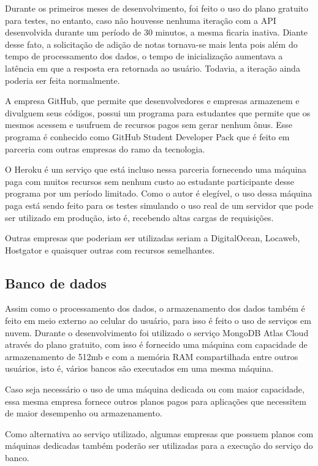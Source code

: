 Durante os primeiros meses de desenvolvimento, foi feito o uso do plano gratuito para testes, no entanto, caso não houvesse nenhuma iteração com a API desenvolvida durante um período de 30 minutos, a mesma ficaria inativa. Diante desse fato, a solicitação de adição de notas tornava-se mais lenta pois além do tempo de processamento dos dados, o tempo de inicialização aumentava a latência em que a resposta era retornada ao usuário. Todavia, a iteração ainda poderia ser feita normalmente.

A empresa GitHub, que permite que desenvolvedores e empresas armazenem e divulguem seus códigos, possui um programa para estudantes que permite que os mesmos acessem e usufruem de recursos pagos sem gerar nenhum ônus. Esse programa é conhecido como GitHub Student Developer Pack\cite{githubStudentPack} que é feito em parceria com outras empresas do ramo da tecnologia.

O Heroku é um serviço que está incluso nessa parceria fornecendo uma máquina paga com muitos recursos sem nenhum custo ao estudante participante desse programa por um período limitado. Como o autor é elegível, o uso dessa máquina paga está sendo feito para os testes simulando o uso real de um servidor que pode ser utilizado em produção, isto é, recebendo altas cargas de requisições.

Outras empresas que poderiam ser utilizadas seriam a DigitalOcean, Locaweb, Hostgator e quaisquer outras com recursos semelhantes.

\subsection{Banco de dados}

Assim como o processamento dos dados, o armazenamento dos dados também é feito em meio externo ao celular do usuário, para isso é feito o uso de serviços em nuvem. Durante o desenvolvimento foi utilizado o serviço MongoDB Atlas Cloud através do plano gratuito, com isso é fornecido uma máquina com capacidade de armazenamento de 512mb e com a memória RAM compartilhada entre outros usuários, isto é, vários bancos são executados em uma mesma máquina.

Caso seja necessário o uso de uma máquina dedicada ou com maior capacidade, essa mesma empresa fornece outros planos pagos para aplicações que necessitem de maior desempenho ou armazenamento.

Como alternativa ao serviço utilizado, algumas empresas que possuem planos com máquinas dedicadas também poderão ser utilizadas para a execução do serviço do banco.

